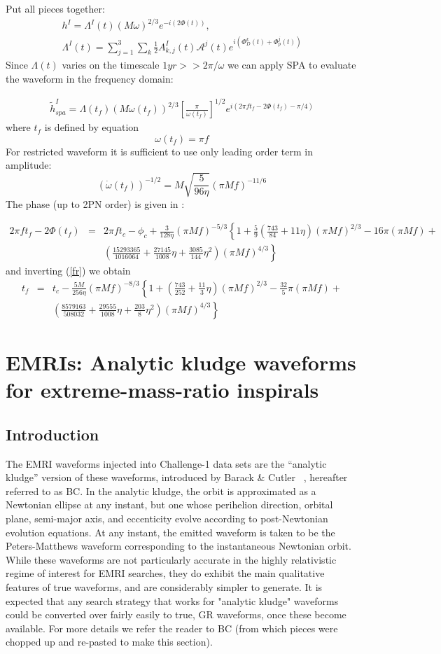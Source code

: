 \documentclass[11pt]{report}
\def\be{\begin{equation}}
\def\bea{\begin{eqnarray}}
\def\en{\end{equation}}
\def\ena{\end{eqnarray}}
\begin{document}
Put all pieces together:
\bea
h^I = \Lambda^I(t) (M\omega)^{2/3}e^{-i(2\Phi(t))},\\
\Lambda^I(t) = \sum_{j=1}^{3}\sum_k \frac1{2}
A_{k,j}^I(t)\mathcal{A}^j(t)e^{i(\Phi_D^k(t) + \Phi_p^j(t))}
\ena
Since $\Lambda(t)$ varies on the timescale $1yr >> 2\pi/\omega$
we can apply SPA to evaluate the waveform in the frequency domain:

\bea
\tilde{h}^I_{spa} = \Lambda(t_f) (M\omega(t_f))^{2/3}
\left[ \frac{\pi}{\dot{\omega}(t_f)} \right]^{1/2}
e^{i(2\pi ft_f - 2\Phi(t_f) - \pi/4)}
\ena
where $t_f$ is defined by equation
\be
\omega(t_f) = \pi f
\en
For restricted waveform it is sufficient to use only leading
order term in amplitude:
\be
(\dot{\omega}(t_f))^{-1/2} = M\sqrt{\frac{5}{96\eta}} 
(\pi Mf)^{-11/6}
\en
The phase (up to 2PN order) is given in \cite{DIS}:

\bea
2\pi ft_f - 2\Phi(t_f) &=& 2\pi ft_c - \phi_c + 
\frac3{128\eta}(\pi Mf)^{-5/3}\left\{ 
1 + \frac5{9}\left( \frac{743}{84} + 11\eta\right)(\pi Mf)^{2/3} - 16\pi
(\pi Mf) + \right.\nonumber\\
& & \left. \left( \frac{15293365}{1016064} + \frac{27145}{1008}\eta
+ \frac{3085}{144}\eta^2\right) (\pi Mf)^{4/3}
\right\} 
\ena
and inverting (\ref{fr}) we obtain
\bea
t_f  &=& t_c - \frac{5M}{256\eta}(\pi Mf)^{-8/3}\left\{
1 + \left( \frac{743}{252} + \frac{11}{3}\eta \right)(\pi Mf)^{2/3}
- \frac{32}{5}\pi (\pi Mf) + \right. \nonumber \\
& & \left. \left( \frac{8579163}{508032} + 
\frac{29555}{1008}\eta + \frac{203}{8}\eta^2\right) (\pi Mf)^{4/3}
\right\}
\ena


\section{EMRIs: Analytic kludge waveforms for extreme-mass-ratio inspirals}

\subsection{Introduction}
The EMRI waveforms injected into Challenge-1 data sets are the ``analytic kludge'' version of these waveforms, introduced by Barack \& Cutler ~\cite{BC}, hereafter
referred to as BC.  In the analytic kludge, 
the orbit is approximated as a Newtonian ellipse at any instant, but one whose
perihelion direction, orbital plane, semi-major axis, and eccenticity evolve 
according to post-Newtonian evolution equations.  At any instant, the emitted waveform
is taken to be the Peters-Matthews waveform corresponding to the instantaneous
Newtonian orbit.  While these waveforms are not particularly accurate in the
highly relativistic regime of interest for EMRI searches, they do exhibit the main qualitative
features of true waveforms, and are considerably simpler to generate.   It is expected that
any search strategy that works for "analytic kludge" waveforms could be converted over fairly
easily to true, GR waveforms, once these become available.
For more details we refer the reader to  BC (from which pieces were chopped up and
re-pasted to make this section).
\end{document}
